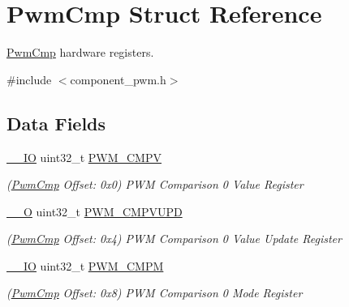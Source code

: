 \hypertarget{structPwmCmp}{}\section{Pwm\+Cmp Struct Reference}
\label{structPwmCmp}


\mbox{\hyperlink{structPwmCmp}{Pwm\+Cmp}} hardware registers.  




{\ttfamily \#include $<$component\+\_\+pwm.\+h$>$}

\subsection*{Data Fields}
\begin{DoxyCompactItemize}
\item 
\mbox{\label{structPwmCmp_a3aed4d2faffef1fd31542d1dfe2ad100}} 
\mbox{\hyperlink{core__cm7_8h_aec43007d9998a0a0e01faede4133d6be}{\+\_\+\+\_\+\+IO}} uint32\+\_\+t \mbox{\hyperlink{structPwmCmp_a3aed4d2faffef1fd31542d1dfe2ad100}{P\+W\+M\+\_\+\+C\+M\+PV}}
\begin{DoxyCompactList}\small\item\em (\mbox{\hyperlink{structPwmCmp}{Pwm\+Cmp}} Offset\+: 0x0) P\+WM Comparison 0 Value Register \end{DoxyCompactList}\item 
\mbox{\label{structPwmCmp_acc0f9de0d0b12b5d9f5b68314f56681d}} 
\mbox{\hyperlink{core__cm7_8h_a7e25d9380f9ef903923964322e71f2f6}{\+\_\+\+\_\+O}} uint32\+\_\+t \mbox{\hyperlink{structPwmCmp_acc0f9de0d0b12b5d9f5b68314f56681d}{P\+W\+M\+\_\+\+C\+M\+P\+V\+U\+PD}}
\begin{DoxyCompactList}\small\item\em (\mbox{\hyperlink{structPwmCmp}{Pwm\+Cmp}} Offset\+: 0x4) P\+WM Comparison 0 Value Update Register \end{DoxyCompactList}\item 
\mbox{\label{structPwmCmp_a284c659bca7e07ff35fc8c2ec7f6e55b}} 
\mbox{\hyperlink{core__cm7_8h_aec43007d9998a0a0e01faede4133d6be}{\+\_\+\+\_\+\+IO}} uint32\+\_\+t \mbox{\hyperlink{structPwmCmp_a284c659bca7e07ff35fc8c2ec7f6e55b}{P\+W\+M\+\_\+\+C\+M\+PM}}
\begin{DoxyCompactList}\small\item\em (\mbox{\hyperlink{structPwmCmp}{Pwm\+Cmp}} Offset\+: 0x8) P\+WM Comparison 0 Mode Register \end{DoxyCompactList}\item 

\end{DoxyCompactItemize}
